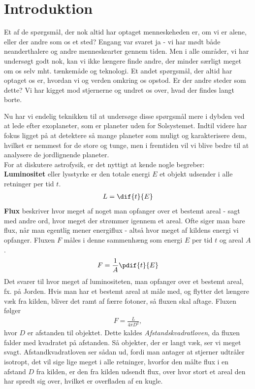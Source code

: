 \section{Introduktion} \label{exointro}
Et af de spørgsmål, der nok altid har optaget menneskeheden er, om vi er alene, eller der andre som os et sted? Engang var svaret ja - vi har mødt både neanderthalere og andre menneskearter gennem tiden. Men i alle områder, vi har undersøgt godt nok, kan vi ikke længere finde andre, der minder særligt meget om os selv mht. tænkemåde og teknologi. Et andet spørgsmål, der altid har optaget os er, hvordan vi og verden omkring os opstod. Er der andre steder som dette? Vi har kigget mod stjernerne og undret os over, hvad der findes langt borte.

Nu har vi endelig teknikken til at undersøge disse spørgsmål mere i dybden ved at lede efter exoplaneter, som er planeter uden for Solsystemet. Indtil videre har fokus ligget på at detektere så mange planeter som muligt og karakterisere dem, hvilket er nemmest for de store og tunge, men i fremtiden vil vi blive bedre til at analysere de jordlignende planeter. \\

\noindent
For at diskutere astrofysik, er det nyttigt at kende nogle begreber:\\

\noindent
\textbf{Luminositet} eller lysstyrke er den totale energi $E$ et objekt udsender i alle retninger per tid $t$.
\begin{align}
    L=\dif{t}{E}
\end{align}
\noindent
\textbf{Flux} beskriver hvor meget af noget man opfanger over et bestemt areal - sagt med andre ord, hvor meget der strømmer igennem et areal. Ofte siger man bare flux, når man egentlig mener energiflux - altså hvor meget af kildens energi vi opfanger. Fluxen $F$ måles i denne sammenhæng som energi $E$ per tid $t$ og areal $A$.
\begin{align}
    F=\frac{1}{A}\pdif{t}{E}
\end{align}
Det svarer til hvor meget af luminositeten, man opfanger over et bestemt areal, fx. på Jorden. Hvis man har et bestemt areal at måle med, og flytter det længere væk fra kilden, bliver det ramt af færre fotoner, så fluxen skal aftage. Fluxen følger
\begin{align}
    F=\frac{L}{4\pi D^2}, \label{afstandskv}
\end{align}
hvor $D$ er afstanden til objektet. Dette kaldes \emph{Afstandskvadratloven}, da fluxen falder med kvadratet på afstanden. Så objekter, der er langt væk, ser vi meget svagt. Afstandkvadratloven ser sådan ud, fordi man antager at stjerner udtråler isotropt, det vil sige lige meget i alle retninger, hvorfor den målte flux i en afstand $D$ fra kilden, er den fra kilden udsendt flux, over hvor stort et areal den har spredt sig over, hvilket er overfladen af en kugle.

